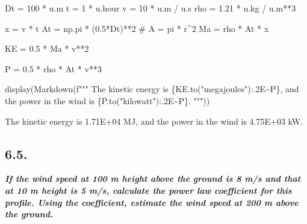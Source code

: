 \documentclass[
  letterpaper,
  DIV=11,
  numbers=noendperiod]{scrartcl}
\newenvironment{Shaded}{\begin{snugshade}}{\end{snugshade}}
\newcommand{\CommentTok}[1]{\textcolor[rgb]{0.37,0.37,0.37}{#1}}
\newcommand{\DecValTok}[1]{\textcolor[rgb]{0.68,0.00,0.00}{#1}}
\newcommand{\ErrorTok}[1]{\textcolor[rgb]{0.68,0.00,0.00}{#1}}
\newcommand{\FloatTok}[1]{\textcolor[rgb]{0.68,0.00,0.00}{#1}}
\newcommand{\NormalTok}[1]{\textcolor[rgb]{0.00,0.23,0.31}{#1}}
\newcommand{\OperatorTok}[1]{\textcolor[rgb]{0.37,0.37,0.37}{#1}}
\newcommand{\SpecialCharTok}[1]{\textcolor[rgb]{0.37,0.37,0.37}{#1}}
\newcommand{\SpecialStringTok}[1]{\textcolor[rgb]{0.13,0.47,0.30}{#1}}
\newcommand{\StringTok}[1]{\textcolor[rgb]{0.13,0.47,0.30}{#1}}
\begin{document}
\begin{Shaded}
\begin{Highlighting}[]
\NormalTok{Dt }\OperatorTok{=} \DecValTok{100} \OperatorTok{*}\NormalTok{ u.m}
\NormalTok{t }\OperatorTok{=} \DecValTok{1} \OperatorTok{*}\NormalTok{ u.hour }
\NormalTok{v }\OperatorTok{=} \DecValTok{10} \OperatorTok{*}\NormalTok{ u.m }\OperatorTok{/}\NormalTok{ u.s }
\NormalTok{rho }\OperatorTok{=} \FloatTok{1.21} \OperatorTok{*}\NormalTok{ u.kg }\OperatorTok{/}\NormalTok{ u.m}\OperatorTok{**}\DecValTok{3}

\NormalTok{x }\OperatorTok{=}\NormalTok{ v }\OperatorTok{*}\NormalTok{ t }
\NormalTok{At }\OperatorTok{=}\NormalTok{ np.pi }\OperatorTok{*}\NormalTok{ (}\FloatTok{0.5}\OperatorTok{*}\NormalTok{Dt)}\OperatorTok{**}\DecValTok{2} \CommentTok{\# A = pi * r\^{}2 }
\NormalTok{Ma }\OperatorTok{=}\NormalTok{ rho }\OperatorTok{*}\NormalTok{ At }\OperatorTok{*}\NormalTok{ x }

\NormalTok{KE }\OperatorTok{=} \FloatTok{0.5} \OperatorTok{*}\NormalTok{ Ma }\OperatorTok{*}\NormalTok{ v}\OperatorTok{**}\DecValTok{2}

\NormalTok{P }\OperatorTok{=} \FloatTok{0.5} \OperatorTok{*}\NormalTok{ rho }\OperatorTok{*}\NormalTok{ At }\OperatorTok{*}\NormalTok{ v}\OperatorTok{**}\DecValTok{3}


\NormalTok{display(Markdown(}\SpecialStringTok{f"""}
\SpecialStringTok{The kinetic energy is }\SpecialCharTok{\{}\NormalTok{KE}\SpecialCharTok{.}\NormalTok{to(}\StringTok{"megajoules"}\NormalTok{)}\SpecialCharTok{:}\FloatTok{.2}\ErrorTok{E}\OperatorTok{\textasciitilde{}}\NormalTok{P}\SpecialCharTok{\}}\SpecialStringTok{, and the power in the wind is }\SpecialCharTok{\{}\NormalTok{P}\SpecialCharTok{.}\NormalTok{to(}\StringTok{"kilowatt"}\NormalTok{)}\SpecialCharTok{:}\FloatTok{.2}\ErrorTok{E}\OperatorTok{\textasciitilde{}}\NormalTok{P}\SpecialCharTok{\}}\SpecialStringTok{.}
\SpecialStringTok{"""}\NormalTok{))}
\end{Highlighting}
\end{Shaded}

The kinetic energy is 1.71E+04 MJ, and the power in the wind is 4.75E+03
kW.

\hypertarget{section-2}{%
\subsection{6.5.}\label{section-2}}

\textbf{\emph{If the wind speed at 100 m height above the ground is 8
m/s and that at 10 m height is 5 m/s, calculate the power law
coefficient for this profile. Using the coefficient, estimate the wind
speed at 200 m above the ground.}}
\end{document}
